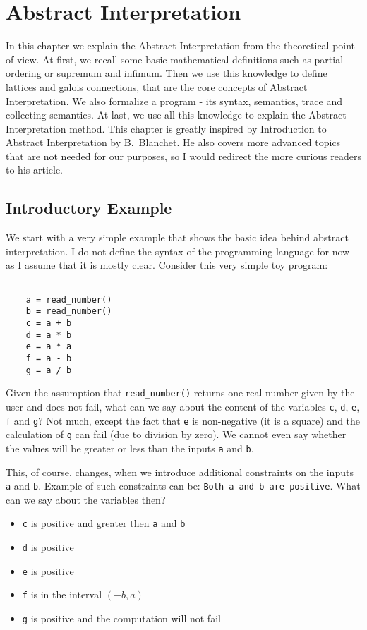 \chapter{Abstract Interpretation}

In this chapter we explain the Abstract Interpretation from the theoretical point of view.
At first, we recall some basic mathematical definitions such as partial ordering or supremum and infimum.
Then we use this knowledge to define lattices and galois connections, that are the core concepts of Abstract
Interpretation.
We also formalize a program - its syntax, semantics, trace and collecting semantics.
At last, we use all this knowledge to explain the Abstract Interpretation method.
This chapter is greatly inspired by Introduction to Abstract Interpretation by B.~Blanchet\cite{Blanchet:2002:AI}.
He also covers more advanced topics that are not needed for our purposes, so I would redirect the more curious readers
to his article.


\section{Introductory Example} %

We start with a very simple example that shows the basic idea behind abstract interpretation.
I do not define the syntax of the programming language for now as I assume that it is mostly clear.
Consider this very simple toy program:

\begin{verbatim}

    a = read_number()
    b = read_number()
    c = a + b
    d = a * b
    e = a * a
    f = a - b
    g = a / b

\end{verbatim}

Given the assumption that \verb|read_number()| returns one real number given by the user and does not fail, what can
we say about the content of the variables \verb|c|, \verb|d|, \verb|e|, \verb|f| and \verb|g|?
Not much, except the fact that \verb|e| is non-negative (it is a square) and the calculation of \verb|g| can fail
(due to division by zero).
We cannot even say whether the values will be greater or less than the inputs \verb|a| and \verb|b|.

This, of course, changes, when we introduce additional constraints on the inputs \verb|a| and \verb|b|.
Example of such constraints can be: \verb|Both a and b are positive|.
What can we say about the variables then?
\begin{itemize}
    \item \verb|c| is positive and greater then \verb|a| and \verb|b|
    \item \verb|d| is positive
    \item \verb|e| is positive
    \item \verb|f| is in the interval $(-b, a)$
    \item \verb|g| is positive and the computation will not fail
\end{itemize}

